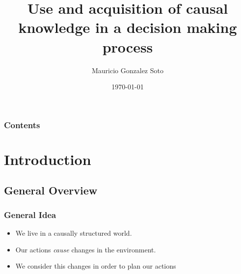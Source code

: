 \documentclass{beamer}
\title[Short title]{Use and acquisition of causal knowledge in a decision making process} %
\author{Mauricio Gonzalez Soto} %
\institute[INAOE] %
{
Instituto Nacional de Astrofísica Óptica y Electrónica \\ %
\medskip
\textit{mauricio@inaoep.mx} %
}
\date{\today} %
\theoremstyle{plain}
\begin{document}
\begin{frame}
\titlepage %
\end{frame}

\begin{frame}[allowframebreaks]
\frametitle{Contents} %
\tableofcontents[hideallsubsections] %
\end{frame}

%


\section{Introduction}
\subsection{General Overview}
\begin{frame}
\frametitle{General Idea}
\begin{itemize}
\item We live in a causally structured world. 
\item Our actions \textit{cause} changes in the environment.
\item We consider this changes in order to plan our actions
\end{itemize}
\end{frame}
\end{document}
